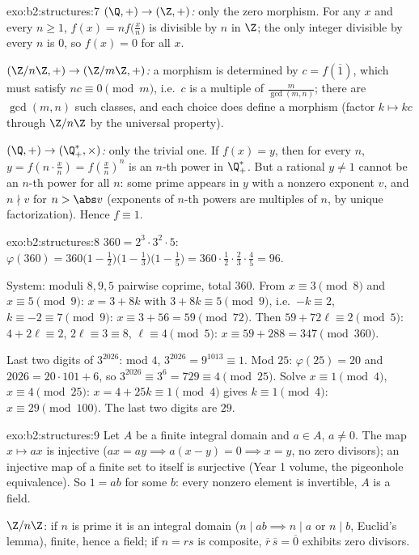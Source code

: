 \begin{solution}{exo:b2:structures:7}
\emph{$(\Q,+) \to (\Z,+)$:} only the zero morphism. For any $x$ and
every $n \geq 1$, $f(x) = n f\bigl(\frac xn\bigr)$ is divisible by
$n$ in $\Z$; the only integer divisible by every $n$ is $0$, so
$f(x) = 0$ for all $x$.

\emph{$(\Z/n\Z, +) \to (\Z/m\Z, +)$:} a morphism is determined by
$c = f(\overline 1)$, which must satisfy $n c \equiv 0 \pmod m$,
i.e.\ $c$ is a multiple of $\frac{m}{\gcd(m,n)}$; there are
$\gcd(m,n)$ such classes, and each choice does define a morphism
(factor $k \mapsto kc$ through $\Z/n\Z$ by the universal property).

\emph{$(\Q, +) \to (\Q_+^*, \times)$:} only the trivial one. If
$f(x) = y$, then for every $n$, $y = f(n \cdot \frac xn) =
f(\frac xn)^n$ is an $n$-th power in $\Q_+^*$. But a rational
$y \neq 1$ cannot be an $n$-th power for all $n$: some prime appears
in $y$ with a nonzero exponent $v$, and $n \nmid v$ for $n > \abs
v$ (exponents of $n$-th powers are multiples of $n$, by unique
factorization). Hence $f \equiv 1$.
\end{solution}

\begin{solution}{exo:b2:structures:8}
$360 = 2^3 \cdot 3^2 \cdot 5$:
$\varphi(360) = 360\bigl(1 - \tfrac12\bigr)\bigl(1 -
\tfrac13\bigr)\bigl(1 - \tfrac15\bigr) = 360 \cdot \tfrac12 \cdot
\tfrac23 \cdot \tfrac45 = 96$.

System: moduli $8, 9, 5$ pairwise coprime, total $360$. From $x
\equiv 3 \pmod 8$ and $x \equiv 5 \pmod 9$: $x = 3 + 8k$ with $3 +
8k \equiv 5 \pmod 9$, i.e.\ $-k \equiv 2$, $k \equiv -2 \equiv 7
\pmod 9$: $x \equiv 3 + 56 = 59 \pmod{72}$. Then $59 + 72\ell \equiv
2 \pmod 5$: $4 + 2\ell \equiv 2$, $2\ell \equiv 3 \equiv 8$, $\ell
\equiv 4 \pmod 5$: $x \equiv 59 + 288 = 347 \pmod{360}$.

Last two digits of $3^{2026}$: mod $4$, $3^{2026} = 9^{1013} \equiv
1$. Mod $25$: $\varphi(25) = 20$ and $2026 = 20\cdot101 + 6$, so
$3^{2026} \equiv 3^6 = 729 \equiv 4 \pmod{25}$. Solve $x \equiv 1
\pmod 4$, $x \equiv 4 \pmod{25}$: $x = 4 + 25k \equiv 1 \pmod 4$
gives $k \equiv 1 \pmod 4$: $x \equiv 29 \pmod{100}$. The last two
digits are $29$.
\end{solution}

\begin{solution}{exo:b2:structures:9}
Let $A$ be a finite integral domain and $a \in A$, $a \neq 0$. The
map $x \mapsto ax$ is injective ($ax = ay \implies a(x - y) = 0
\implies x = y$, no zero divisors); an injective map of a finite set
to itself is surjective (Year 1 volume, the pigeonhole equivalence).
So $1 = ab$ for some $b$: every nonzero element is invertible, $A$
is a field.

$\Z/n\Z$: if $n$ is prime it is an integral domain ($n \mid ab
\implies n \mid a$ or $n \mid b$, Euclid's lemma), finite, hence a
field; if $n = rs$ is composite, $\overline r\,\overline s =
\overline 0$ exhibits zero divisors.
\end{solution}

